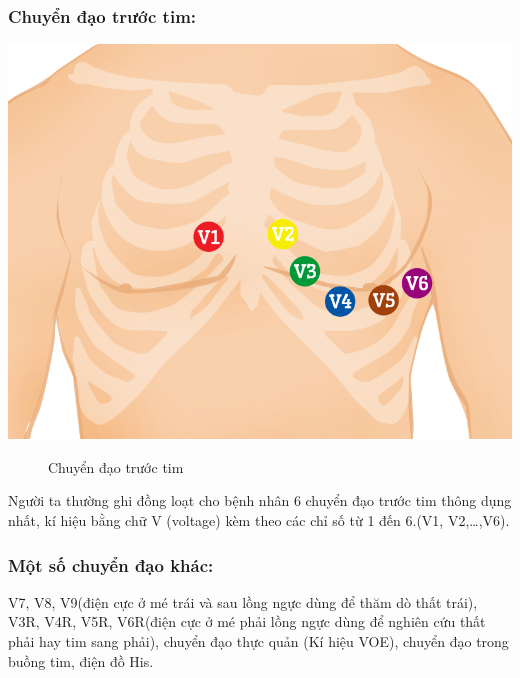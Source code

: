 \subsubsection{Chuyển đạo trước tim:}
\begin{center}
    \includegraphics[scale=.3]{image/week1/chuyendaotruocnguc.png}
    \begin{figure}[htp]
    \begin{center}
    \end{center}
    \caption{Chuyển đạo trước tim \cite{chuyendao}}
    \end{figure}
\end{center}
Người ta thường ghi đồng loạt cho bệnh nhân 6 chuyển đạo trước tim thông dụng nhất, kí hiệu bằng chữ V (voltage) kèm theo các chỉ số từ 1 đến 6.(V1, V2,…,V6).

\subsubsection{Một số chuyển đạo khác:}
V7, V8, V9(điện cực ở mé trái và sau lồng ngực dùng để thăm dò thất trái), V3R, V4R, V5R, V6R(điện cực ở mé phải lồng ngực dùng để nghiên cứu thất phải hay tim sang phải), chuyển đạo thực quản (Kí hiệu VOE), chuyển đạo trong buồng tim, điện đồ His.


